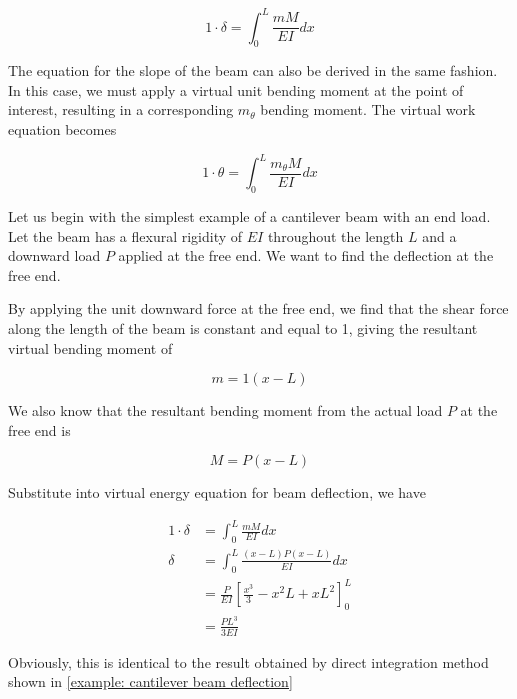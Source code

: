 \documentclass[
10pt,
a4paper,
openany,
svgnames,
]{book} %
\begin{document}
\begin{equation}
  1 \cdot \delta = \int_0^L \frac{mM}{EI} dx
\end{equation}

The equation for the slope of the beam can also be derived in the same fashion. In this case, we must apply a virtual unit bending moment at the point of interest, resulting in a corresponding $m_\theta$ bending moment. The virtual work equation becomes

\begin{equation}
  1 \cdot \theta = \int_0^L \frac{m_\theta M}{EI} dx
\end{equation}

\begin{example}
  Let us begin with the simplest example of a cantilever beam with an end load. Let the beam has a flexural rigidity of $EI$ throughout the length $L$ and a downward load $P$ applied at the free end. We want to find the deflection at the free end.

  \centering
\end{example}
\begin{solution}
  By applying the unit downward force at the free end, we find that the shear force along the length of the beam is constant and equal to 1, giving the resultant virtual bending moment of

  \begin{equation*}
    m = 1(x - L)
  \end{equation*}

  We also know that the resultant bending moment from the actual load $P$ at the free end is

  \begin{equation*}
    M = P(x - L)
  \end{equation*}

  Substitute into virtual energy equation for beam deflection, we have

  \begin{align*}
    1 \cdot \delta &= \int_0^L \frac{mM}{EI} dx \\
    \delta &= \int_0^L \frac{(x-L)P(x-L)}{EI} dx \\
                   &= \frac{P}{EI} \left[ \frac{x^3}{3} - x^2L +  xL^2 \right]_0^L \\
                   &= \frac{PL^3}{3EI}
  \end{align*}

  Obviously, this is identical to the result obtained by direct integration method shown in \cref{example: cantilever beam deflection}
\end{solution}
\end{document}
